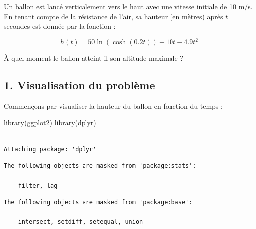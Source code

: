 \documentclass[
  12pt,
  letterpaper,
]{book}
\newenvironment{Shaded}{}{}
\newcommand{\FunctionTok}[1]{\textcolor[rgb]{0.44,0.26,0.76}{#1}}
\newcommand{\NormalTok}[1]{\textcolor[rgb]{0.14,0.16,0.18}{#1}}
\theoremstyle{remark}
\begin{document}
Un ballon est lancé verticalement vers le haut avec une vitesse initiale
de 10 m/s. En tenant compte de la résistance de l'air, sa hauteur (en
mètres) après \(t\) secondes est donnée par la fonction :

\[h(t) = 50\ln(\cosh(0.2t)) + 10t - 4.9t^2\]

À quel moment le ballon atteint-il son altitude maximale ?

\hypertarget{visualisation-du-probluxe8me}{%
\subsection{1. Visualisation du
problème}\label{visualisation-du-probluxe8me}}

Commençons par visualiser la hauteur du ballon en fonction du temps :

\begin{Shaded}
\begin{Highlighting}[]
\FunctionTok{library}\NormalTok{(ggplot2)}
\FunctionTok{library}\NormalTok{(dplyr)}
\end{Highlighting}
\end{Shaded}

\begin{verbatim}

Attaching package: 'dplyr'
\end{verbatim}

\begin{verbatim}
The following objects are masked from 'package:stats':

    filter, lag
\end{verbatim}

\begin{verbatim}
The following objects are masked from 'package:base':

    intersect, setdiff, setequal, union
\end{verbatim}
\end{document}

